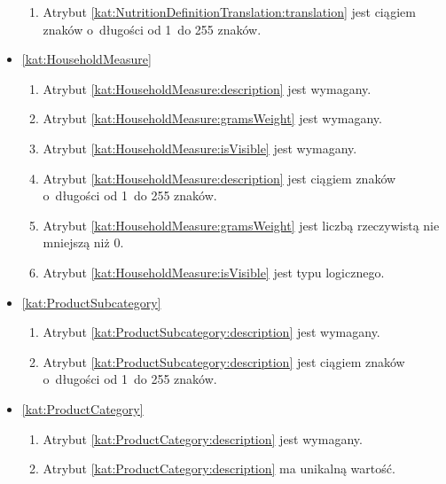 \begin{itemize}[label={\textbf{Ograniczenia dla}}, wide, labelwidth=!, labelindent=0pt]
\begin{enumerate}[label={\textbf{OGR/2/\protect\twodigits{\arabic{enumi}}}}, wide, labelwidth=!, align=left, leftmargin=3cm, resume]
        \item Atrybut \ref{kat:NutritionDefinitionTranslation:translation} jest ciągiem znaków o~długości od 1~do 255 znaków.
    \end{enumerate}

    \item\ref{kat:HouseholdMeasure}\mynobreakpar
    \begin{enumerate}[label={\textbf{OGR/2/\protect\twodigits{\arabic{enumi}}}}, wide, labelwidth=!, align=left, leftmargin=3cm, resume]
        \item Atrybut \ref{kat:HouseholdMeasure:description} jest wymagany.
        \item Atrybut \ref{kat:HouseholdMeasure:gramsWeight} jest wymagany.
        \item Atrybut \ref{kat:HouseholdMeasure:isVisible} jest wymagany.

        \item Atrybut \ref{kat:HouseholdMeasure:description} jest ciągiem znaków o~długości od 1~do 255 znaków.
        \item Atrybut \ref{kat:HouseholdMeasure:gramsWeight} jest liczbą rzeczywistą nie mniejszą niż 0.
        \item Atrybut \ref{kat:HouseholdMeasure:isVisible} jest typu logicznego.
    \end{enumerate}

    \item\ref{kat:ProductSubcategory}\mynobreakpar
    \begin{enumerate}[label={\textbf{OGR/2/\protect\twodigits{\arabic{enumi}}}}, wide, labelwidth=!, align=left, leftmargin=3cm, resume]
        \item Atrybut \ref{kat:ProductSubcategory:description} jest wymagany.

        \item Atrybut \ref{kat:ProductSubcategory:description} jest ciągiem znaków o~długości od 1~do 255 znaków.
    \end{enumerate}

    \item\ref{kat:ProductCategory}\mynobreakpar
    \begin{enumerate}[label={\textbf{OGR/2/\protect\twodigits{\arabic{enumi}}}}, wide, labelwidth=!, align=left, leftmargin=3cm, resume]
        \item Atrybut \ref{kat:ProductCategory:description} jest wymagany.

        \item Atrybut \ref{kat:ProductCategory:description} ma unikalną wartość.


\end{enumerate}
\end{itemize}
